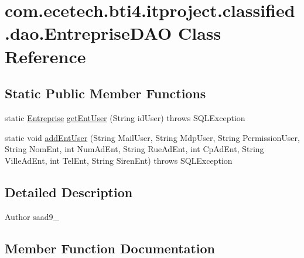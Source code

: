 \hypertarget{classcom_1_1ecetech_1_1bti4_1_1itproject_1_1classified_1_1dao_1_1_entreprise_d_a_o}{}\section{com.\+ecetech.\+bti4.\+itproject.\+classified.\+dao.\+Entreprise\+D\+AO Class Reference}
\label{classcom_1_1ecetech_1_1bti4_1_1itproject_1_1classified_1_1dao_1_1_entreprise_d_a_o}
\subsection*{Static Public Member Functions}
\begin{DoxyCompactItemize}
\item 
static \hyperlink{classcom_1_1ecetech_1_1bti4_1_1itproject_1_1classified_1_1beans_1_1_entreprise}{Entreprise} \hyperlink{classcom_1_1ecetech_1_1bti4_1_1itproject_1_1classified_1_1dao_1_1_entreprise_d_a_o_a158d89d2f3ff3a1e5ca02c9a3751da84}{get\+Ent\+User} (String id\+User)  throws S\+Q\+L\+Exception 
\item 
static void \hyperlink{classcom_1_1ecetech_1_1bti4_1_1itproject_1_1classified_1_1dao_1_1_entreprise_d_a_o_a34495007d915aad23a8ad7a1dab4c179}{add\+Ent\+User} (String Mail\+User, String Mdp\+User, String Permission\+User, String Nom\+Ent, int Num\+Ad\+Ent, String Rue\+Ad\+Ent, int Cp\+Ad\+Ent, String Ville\+Ad\+Ent, int Tel\+Ent, String Siren\+Ent)  throws S\+Q\+L\+Exception 
\end{DoxyCompactItemize}


\subsection{Detailed Description}
\begin{DoxyAuthor}{Author}
saad9\+\_ 
\end{DoxyAuthor}


\subsection{Member Function Documentation}
